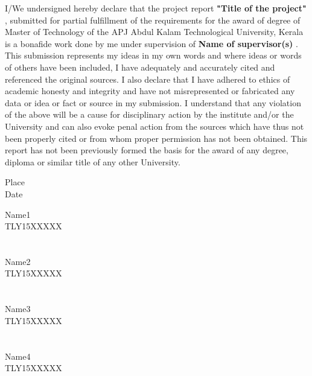 \documentclass[BTech]{cetlyproj}
\begin{document}
I/We undersigned hereby declare that the project report {\bf "Title of the project" }, submitted for partial fulfillment of the requirements for the award of degree of Master of Technology of the APJ Abdul Kalam Technological University, Kerala is a bonafide work done by me under supervision of {\bf Name of supervisor(s)} . This submission represents my ideas in my own words and where ideas or words of others have been included, I have adequately and accurately cited and referenced the original sources. I also declare that I have adhered to ethics of academic honesty and integrity and have not misrepresented or fabricated any data or idea or fact or source in my submission. I understand that any violation of the above will be a cause for disciplinary action by the institute and/or the University and can also evoke penal action from the sources which have thus not been properly cited or from whom proper permission has not been obtained. This report has not been previously formed the basis for the award of any degree, diploma or similar title of any other University.\par
\vspace*{0.2in}
\begin{singlespacing}
	\hspace*{-0.25in}
	\parbox{2.5in}{
		\vspace{3.2in}
		\noindent Place \\
		\noindent Date \\
	} 
	\hspace*{1.0in}
	\parbox{2.5in}{
		\noindent
		\noindent Name1\\
		\noindent TLY15XXXXX
		\\
		\\ \\
		\noindent
		\noindent Name2\\
		\noindent TLY15XXXXX
		\\
		\\ \\
		\noindent
		\noindent Name3\\
		\noindent TLY15XXXXX
		\\
		\\ \\
		\noindent
		\noindent Name4\\
		\noindent TLY15XXXXX
	}  
\end{singlespacing}
\certificate

\vspace*{0.25in}
\end{document}

